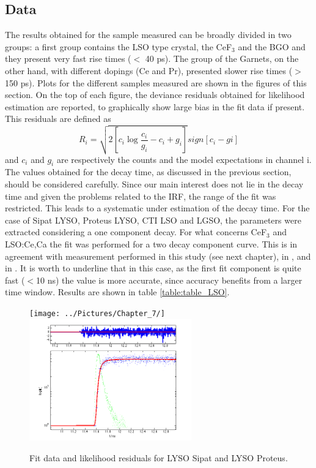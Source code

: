 \subsection{Data}
The results obtained for the sample measured can be broadly divided in two groups: a first group contains the LSO type crystal, the CeF$_{3}$ and the BGO and they present very fast rise times ($<$ 40 ps).
The group of the Garnets, on the other hand, with different dopings (Ce and Pr), presented slower rise times ($>$150 ps).
Plots for the different samples measured are shown in the figures of this section. On the top of each figure, the deviance residuals obtained for likelihood estimation are reported, to graphically show large bias in the fit data if present. This residuals are defined as
\begin{equation}
R_{i} = \sqrt{2\left[ c_{i}\log{\frac{c_{i}}{g_{i}}-c_{i}+g_{i}} \right]}sign\left[ c_{i}-g{i} \right]
\end{equation}
and $c_{i}$ and $g_{i}$ are respectively the counts and the model expectations in channel i.
The values obtained for the decay time, as discussed in the previous section, should be considered carefully. 
Since our main interest does not lie in the decay time and given the problems related to the IRF, the range of the fit was restricted. This leads to a systematic under estimation of the decay time.
For the case of Sipat LYSO, Proteus LYSO, CTI LSO and LGSO,  the parameters were extracted considering a one component decay. 
For what concerns CeF$_{3}$ and LSO:Ce,Ca the fit was performed for a two decay component curve. This is in agreement with measurement performed in this study (see next chapter), in \cite{Gundacker2014}, and in \cite{ref:Lecoq2006}.
It is worth to underline that in this case, as the first fit component is quite fast ($<$10 ns) the value is more accurate, since accuracy benefits from a larger time window.
Results are shown in table \ref{table:table_LSO}.

\begin{figure}[htbp]
\begin{center}
\texttt{[image: ../Pictures/Chapter\_7/]}
\includegraphics[width=7cm]{../Pictures/Chapter_7/2737_proteus.png}
\end{center}
\caption[LYSO Sipat and Proteus profile]{Fit data and likelihood residuals for LYSO Sipat and LYSO Proteus.}
\label{fig:sipat_proteus}
\end{figure}

